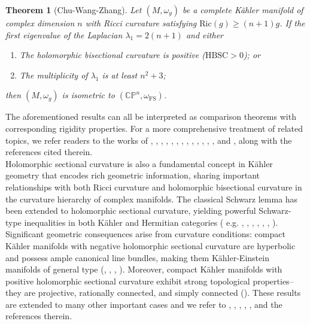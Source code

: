 \documentclass[12pt, reqno]{amsart}
\theoremstyle{plain}
\newtheorem{thm}{Theorem}[section]
\theoremstyle{definition}
\newcommand{\btheorem}{\begin{thm}}
\newcommand{\etheorem}{\end{thm}}
\newcommand{\bd}{\begin{enumerate}}
\newcommand{\ed}{\end{enumerate}}
\renewcommand{\>}{\rightarrow}
\newcommand{\C}{{\mathbb C}}
\renewcommand{\P}{{\mathbb P}}
\newcommand{\om}{\omega}
\renewcommand{\#}{\sharp}
\numberwithin{equation}{section} %
\begin{document}
\btheorem[Chu-Wang-Zhang] Let $(M,\omega_g)$ be a complete K\"ahler manifold of
complex dimension $n$ with Ricci curvature satisfying $\mathrm{Ric}(g)\geq (n+1)g$.
If  the first eigenvalue  of the Laplacian $\lambda_1=2(n+1)$ and either
\bd \item The holomorphic bisectional curvature is positive ($\mathrm{HBSC}>0$); or
\item  The multiplicity of $\lambda_1$ is at least $n^2+3$;
\ed
then $(M,\om_g)$ is isometric to $(\C\P^n,\omega_{\mathrm{FS}})$.

\etheorem

\noindent The aforementioned results can all be interpreted as comparison theorems with corresponding
 rigidity properties. For a more comprehensive treatment of related topics, we refer readers to
 the works of \cite{Pet99}, \cite{LW05}, \cite{Mun09}, \cite{Mun10},
 \cite{TY12}, \cite{Liu14}, \cite{LY18}, \cite{Fuj18}, \cite{NZ18}, \cite{Lot21}, \cite{DSS21}, \cite{Zha22},
  \cite{DS23}, and \cite{XY24+}, along with the references cited therein.\\


Holomorphic sectional curvature is also a fundamental concept in K\"ahler geometry that encodes rich geometric information, sharing important relationships with both Ricci curvature and holomorphic bisectional curvature in the curvature hierarchy of complex manifolds. The classical Schwarz lemma has been extended to holomorphic sectional curvature, yielding powerful Schwarz-type inequalities in both K\"ahler and Hermitian categories  ( e.g. \cite{Yau75}, \cite{CCL79}, \cite{Roy80}, \cite{NZ18}, \cite{CN22}, \cite{Ni21}, \cite{XYY24+}).  Significant geometric consequences arise from curvature conditions: compact K\"ahler manifolds with negative holomorphic sectional curvature are  hyperbolic and possess ample canonical line bundles, making them K\"ahler-Einstein manifolds of general type (\cite{WY16}, \cite{WY16a}, \cite{TY17}, \cite{DT19}). Moreover, compact K\"ahler manifolds with positive holomorphic sectional curvature exhibit strong topological properties--they are projective, rationally connected, and simply connected (\cite{Yan18}). These results are extended to many other important cases and we refer to \cite{YZ19}, \cite{NZ22}, \cite{Mat22}, \cite{Yan24}, \cite{ZZ23+}, \cite{CLZ24+} and the references  therein.\\




  
\end{document}
